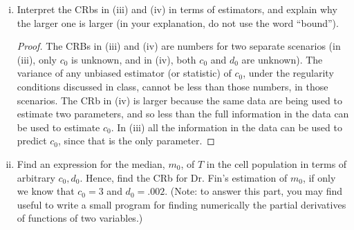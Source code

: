 \documentclass[letterpaper, 12pt]{article}
\begin{document}
\begin{enumerate}[(i)]
\item
Interpret the CRbs in (iii) and (iv) in terms of estimators, and explain why the larger one is larger (in
your explanation, do not use the word “bound”).

\begin{proof}
The CRBs in (iii) and (iv) are numbers for two separate scenarios (in (iii), only $c_0$ is unknown, and in (iv), both $c_0$ and $d_0$ are unknown). The variance of any unbiased estimator (or statistic) of $c_0$, under the regularity conditions discussed in class, cannot be less than those numbers, in those scenarios. The CRb in (iv) is larger because the same data are being used to estimate two parameters, and so less than the full information in the data can be used to estimate $c_0$. In (iii) all the information in the data can be used to predict $c_0$, since that is the only parameter. 
\end{proof}

\item
Find an expression for the median, $m_0$, of $T$ in the cell population in terms of arbitrary $c_0, d_0$. Hence,
find the CRb for Dr. Fin’s estimation of $m_0$, if only we know that $c_0 = 3$ and $d_0 = .002$. (Note: to answer
this part, you may find useful to write a small program for finding numerically the partial derivatives of
functions of two variables.)


\end{enumerate}
\end{document}
